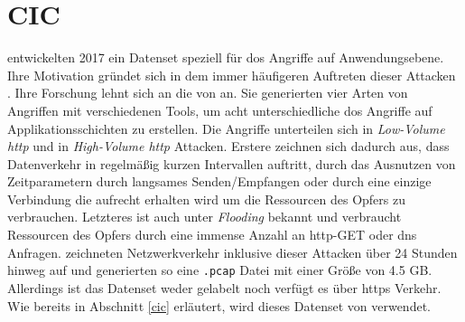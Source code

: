 \documentclass[
    12pt, %
    DIV10,
    ngerman, %
    a4paper, %
    oneside, %
    titlepage, %
    parskip=half, %
    headings=normal, %
    listof=totoc, %
    bibliography=totoc, %
    index=totoc, %
    captions=tableheading, %
    final %
]{scrreprt}
\begin{document}
\section{CIC}
\textcite{jazi2017detecting} entwickelten 2017 ein Datenset speziell für \ac{dos} Angriffe auf Anwendungsebene. Ihre Motivation gründet sich in dem immer häufigeren Auftreten dieser Attacken \parencite{NETSCOUT}.
Ihre Forschung lehnt sich an die von \textcite{shiravi2012toward} an. Sie generierten vier Arten von Angriffen mit verschiedenen Tools, um acht unterschiedliche \ac{dos} Angriffe auf Applikationsschichten zu erstellen. Die Angriffe unterteilen sich in \emph{Low-Volume \ac{http}} und in \emph{High-Volume \ac{http}} Attacken. Erstere zeichnen sich dadurch aus, dass Datenverkehr in regelmä{\ss}ig kurzen Intervallen auftritt, durch das Ausnutzen von Zeitparametern durch langsames Senden/Empfangen oder durch eine einzige Verbindung die aufrecht erhalten wird um die Ressourcen des Opfers zu verbrauchen. Letzteres ist auch unter \emph{Flooding} bekannt und verbraucht Ressourcen des Opfers durch eine immense Anzahl an \ac{http}-GET oder \ac{dns} Anfragen. \textcite{jazi2017detecting} zeichneten Netzwerkverkehr inklusive dieser Attacken über 24 Stunden hinweg auf und generierten so eine \texttt{.pcap} Datei mit einer Grö{\ss}e von 4.5 GB. Allerdings ist das Datenset weder gelabelt noch verfügt es über \ac{https} Verkehr. Wie bereits in Abschnitt \ref{cic} erläutert, wird dieses Datenset von \textcite{siracusano2018detection} verwendet.
\end{document}
